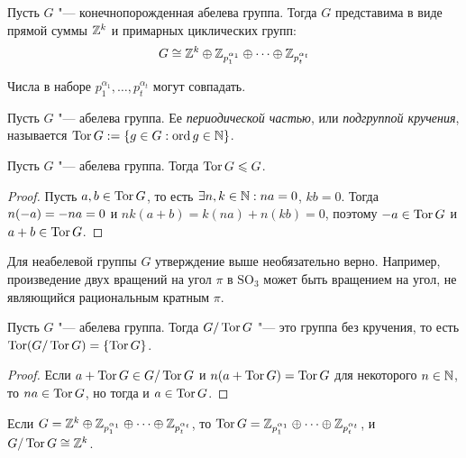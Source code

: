 \begin{corollary}
	Пусть $G$ "--- конечнопорожденная абелева группа. Тогда $G$ представима в виде прямой суммы $\mathbb{Z}^k$ и примарных циклических групп: 
	\[G \cong \mathbb{Z}^k \oplus \mathbb{Z}_{p_1^{\alpha_1}} \oplus \dots \oplus \mathbb{Z}_{p_t^{\alpha_t}}\]
\end{corollary}

\begin{note}
	Числа в наборе $p_1^{\alpha_1}, \dotsc, p_t^{\alpha_t}$ могут совпадать.
\end{note}

\begin{definition}
	Пусть $G$ "--- абелева группа. Ее \textit{периодической частью}, или \textit{подгруппой кручения}, называется $\operatorname{Tor}{G} := \{g \in G: \operatorname{ord}{g} \in \mathbb{N}\}$.
\end{definition}

\begin{proposition}
	Пусть $G$ "--- абелева группа. Тогда $\operatorname{Tor}{G} \leqslant G$.
\end{proposition}

\begin{proof}
	Пусть $a, b \in \operatorname{Tor}{G}$, то есть $\exists n, k \in \mathbb{N}: na = 0$, $kb = 0$. Тогда $n(-a) \hm= -na = 0$ и $nk(a + b) = k(na) + n(kb) = 0$, поэтому $-a \in \operatorname{Tor}{G}$ и $a + b \in \operatorname{Tor}{G}$.
\end{proof}

\begin{note}
	Для неабелевой группы $G$ утверждение выше необязательно верно. Например, произведение двух вращений на угол $\pi$ в $\mathrm{SO}_3$ может быть вращением на угол, не являющийся рациональным кратным $\pi$.
\end{note}

\begin{proposition}
	Пусть $G$ "--- абелева группа. Тогда $G / \operatorname{Tor}{G}$ "--- это группа без кручения, то есть $\operatorname{Tor}(G / \operatorname{Tor}{G}) = \{\operatorname{Tor}{G}\}$.
\end{proposition}

\begin{proof}
	Если $a + \operatorname{Tor}{G} \in G / \operatorname{Tor}{G}$ и $n(a + \operatorname{Tor}{G}) = \operatorname{Tor}{G}$ для некоторого $n \in \mathbb{N}$, то $na \in \operatorname{Tor}{G}$, но тогда и $a \in \operatorname{Tor}{G}$.
\end{proof}

\begin{proposition}
	Если $G = \mathbb{Z}^k \oplus \mathbb{Z}_{p_1^{\alpha_1}} \oplus \dots \oplus \mathbb{Z}_{p_t^{\alpha_t}}$, то $\Tor{G} \hm= \Z_{p_1^{\alpha_1}} \oplus \dots \oplus \Z_{p_t^{\alpha_t}}$, и $G / \operatorname{Tor}{G} \cong \mathbb{Z}^k$.
\end{proposition}

